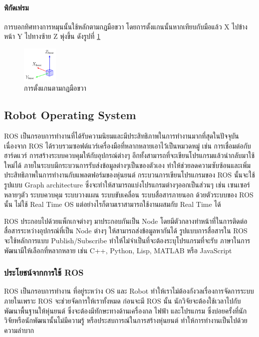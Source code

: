 \paragraph*{พิกัดเฟรม}
การบอกทิศทางการหมุนนั้นใช้หลักตามกฏมือขวา โดยการตั้งแกนนั้นหากเทียบกับมือแล้ว X ไปข้างหน้า Y ไปทางซ้าย Z พุ่งขึ้น ดังรูปที่ \ref{fig:right_hand_rule}
\begin{figure}[!ht]
	\centering
	\includegraphics[width=0.15\textwidth]{chapter2/images/right_hand_rule.png}
	\caption{การตั้งแกนตามกฏมือขวา}
	\label{fig:right_hand_rule}
\end{figure}

\subsection{Robot Operating System}
ROS เป็นกรอบการทำงานที่ได้รับความนิยมและมีประสิทธิภาพในการทำงานมากที่สุดในปัจจุบัน เนื่องจาก ROS
ได้รวบรวมซอฟต์แวร์เครื่องมือที่หลากหลายเอาไว้เป็นหมวดหมู่ เช่น การเชื่อมต่อกับฮาร์ดแวร์
การสร้างระบบควบคุมให้กับอุปกรณ์ต่างๆ อีกทั้งสามารถที่จะเขียนโปรแกรมแล้วนำกลับมาใช้ใหม่ได้
ภายในระบบมีกระบวนการรับส่งข้อมูลต่างๆเป็นของตัวเอง ทำให้ช่วยลดความซับซ้อนและเพิ่มประสิทธิภาพในการทำงานกับแพลตฟอร์มของหุ่นยนต์
กระบวนการเขียนโปรแกรมของ ROS นั้นจะใช้รูปแบบ Graph architecture ซึ่งจะทำให้สามารถแบ่งโปรแกรมต่างๆออกเป็นส่วนๆ เช่น
เซนเซอร์หลายๆตัว ระบบควบคุม ระบบวางแผน ระบบขับเคลื่อน ระบบสื่อสารภายนอก ด้วยตัวระบบของ ROS นั้น ไม่ใช้ Real Time OS
แต่อย่างไรก็ตามเราสามารถใช้งานผสมกับ Real Time ได้

ROS ประกอบไปด้วยแพ็กเกจต่างๆ มาประกอบกันเป็น Node โดยมีตัวกลางทำหน้าที่ในการติดต่อสื่อสารระหว่างอุปกรณ์ที่เป็น Node ต่างๆ
ให้สามารถส่งข้อมูลหากันได้ รูปแบบการสื่อสารใน ROS จะใช้หลักการแบบ Publish/Subscribe ทำให้ไม่จำเป็นที่จะต้องระบุโปรแกรมที่จะรับ
ภาษาในการพัฒนามีให้เลือกที่หลากหลาย เช่น C++, Python, Lisp, MATLAB หรือ JavaScript 

\subsubsection*{ประโยชน์จากการใช้ ROS}
ROS เป็นกรอบการทำงาน ที่อยู่ระหว่าง OS และ Robot ทำให้เราไม่ต้องกังวลเรื่องการจัดการระบบภายในเพราะ
ROS จะช่วยจัดการให้เราทั้งหมด ก่อนจะมี ROS นั้น นักวิจัยจะต้องใช้เวลาไปกับพัฒนาพื้นฐานให้หุ่นยนต์
ซึ่งจะต้องมีทักษะทางด้านเครื่องกล ไฟฟ้า และโปรแกรม ซึ่งบ่อยครั้งที่นักวิจัยหรือนักพัฒนานั้นไม่มีความรู้
หรือประสบการณ์ในการสร้างหุ่นยนต์ ทำให้การทำงานเป็นไปด้วยความลำบาก